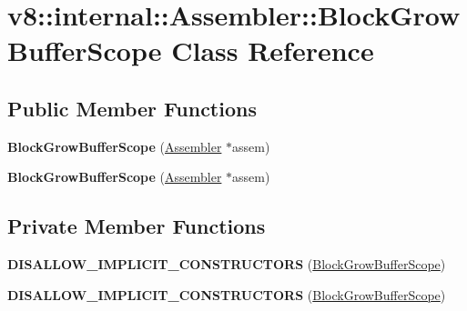 \hypertarget{classv8_1_1internal_1_1_assembler_1_1_block_grow_buffer_scope}{}\section{v8\+:\+:internal\+:\+:Assembler\+:\+:Block\+Grow\+Buffer\+Scope Class Reference}
\label{classv8_1_1internal_1_1_assembler_1_1_block_grow_buffer_scope}
\subsection*{Public Member Functions}
\begin{DoxyCompactItemize}
\item 
{\bfseries Block\+Grow\+Buffer\+Scope} (\hyperlink{classv8_1_1internal_1_1_assembler}{Assembler} $\ast$assem)\hypertarget{classv8_1_1internal_1_1_assembler_1_1_block_grow_buffer_scope_ab54b604bd347f5376c2c513ce648ec7e}{}\label{classv8_1_1internal_1_1_assembler_1_1_block_grow_buffer_scope_ab54b604bd347f5376c2c513ce648ec7e}

\item 
{\bfseries Block\+Grow\+Buffer\+Scope} (\hyperlink{classv8_1_1internal_1_1_assembler}{Assembler} $\ast$assem)\hypertarget{classv8_1_1internal_1_1_assembler_1_1_block_grow_buffer_scope_ab54b604bd347f5376c2c513ce648ec7e}{}\label{classv8_1_1internal_1_1_assembler_1_1_block_grow_buffer_scope_ab54b604bd347f5376c2c513ce648ec7e}

\end{DoxyCompactItemize}
\subsection*{Private Member Functions}
\begin{DoxyCompactItemize}
\item 
{\bfseries D\+I\+S\+A\+L\+L\+O\+W\+\_\+\+I\+M\+P\+L\+I\+C\+I\+T\+\_\+\+C\+O\+N\+S\+T\+R\+U\+C\+T\+O\+RS} (\hyperlink{classv8_1_1internal_1_1_assembler_1_1_block_grow_buffer_scope}{Block\+Grow\+Buffer\+Scope})\hypertarget{classv8_1_1internal_1_1_assembler_1_1_block_grow_buffer_scope_a29e315b4cce020de8bd63ce3f4aa9e36}{}\label{classv8_1_1internal_1_1_assembler_1_1_block_grow_buffer_scope_a29e315b4cce020de8bd63ce3f4aa9e36}

\item 
{\bfseries D\+I\+S\+A\+L\+L\+O\+W\+\_\+\+I\+M\+P\+L\+I\+C\+I\+T\+\_\+\+C\+O\+N\+S\+T\+R\+U\+C\+T\+O\+RS} (\hyperlink{classv8_1_1internal_1_1_assembler_1_1_block_grow_buffer_scope}{Block\+Grow\+Buffer\+Scope})\hypertarget{classv8_1_1internal_1_1_assembler_1_1_block_grow_buffer_scope_a29e315b4cce020de8bd63ce3f4aa9e36}{}\label{classv8_1_1internal_1_1_assembler_1_1_block_grow_buffer_scope_a29e315b4cce020de8bd63ce3f4aa9e36}

\end{DoxyCompactItemize}
